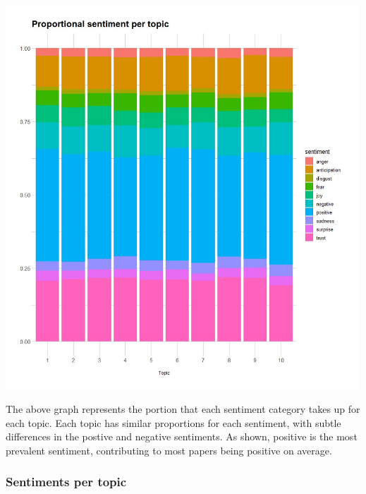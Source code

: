 \documentclass[
  letterpaper,
  DIV=11,
  numbers=noendperiod]{scrartcl}
\begin{document}
\includegraphics[width=5.20833in,height=\textheight]{images/PropSentimentPerTopic-01.jpg}

The above graph represents the portion that each sentiment category
takes up for each topic. Each topic has similar proportions for each
sentiment, with subtle differences in the postive and negative
sentiments. As shown, positive is the most prevalent sentiment,
contributing to most papers being positive on average.

\hypertarget{sentiments-per-topic}{%
\subsubsection{Sentiments per topic}\label{sentiments-per-topic}}
\end{document}
